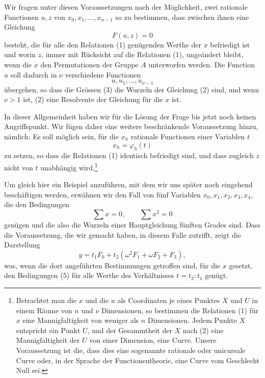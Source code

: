 \documentclass[11pt]{article}
\begin{document}
Wir fragen unter diesen Voraussetzungen nach der Möglichkeit, zwei rationale Functionen \(u,z\) von \(x_0,x_1,\ldots,x_{n-1}\) so zu bestimmen, dass zwischen ihnen eine Gleichung
\begin{equation}
F(u,z)=0
\tag{2}
\end{equation}
besteht, die für alle den Relationen (1) genügenden Werthe der \(x\) befriedigt ist und worin \(z\), immer mit Rücksicht auf die Relationen (1), ungeändert bleibt, wenn die \(x\) den Permutationen der Gruppe \(A\) unterworfen werden. Die Function \(u\) soll dadurch in \(\nu\) verschiedene Functionen
\begin{equation}
u,u_1,\ldots,u_{\nu-1}
\tag{3}
\end{equation}
übergehen, so dass die Grössen (3) die Wurzeln der Gleichung (2) sind, und wenn \(\nu>1\) ist, (2) eine Resolvente der Gleichung für die \(x\) ist.

In dieser Allgemeinheit haben wir für die Lösung der Frage bis jetzt noch keinen Angriffspunkt. Wir fügen daher eine weitere beschränkende Voraussetzung hinzu, nämlich: Es soll möglich sein, für die \(x_h\) rationale Functionen einer Variablen \(t\)
\begin{equation}
x_h=\varphi_h(t)
\tag{4}
\end{equation}
zu setzen, so dass die Relationen (1) identisch befriedigt sind, und dass zugleich \(z\) nicht von \(t\) unabhängig wird.\footnote{Betrachtet man die \(x\) und die \(u\) als Coordinaten je eines Punktes \(X\) und \(U\) in einem Räume von \(n\) und \(\nu\) Dimensionen, so bestimmen die Relationen (1) für \(x\) eine Mannigfaltigkeit von weniger als \(n\) Dimensionen. Jedem Punkte \(X\) entspricht ein Punkt \(U\), und der Gesammtheit der \(X\) nach (2) eine Mannigfaltigkeit der \(U\) von einer Dimension, eine Curve. Unsere Voraussetzung ist die, dass dies eine sogenannte rationale oder unicursale Curve oder, in der Sprache der Functionentheorie, eine Curve vom Geschlecht Null sei.}

Um gleich hier ein Beispiel anzuführen, mit dem wir uns später noch eingehend beschäftigen werden, erwähnen wir den Fall von fünf Variablen \(x_0,x_1,x_2,x_3,x_4\), die den Bedingungen
\begin{equation}
\sum x=0,\qquad
\sum x^2=0
\tag{5}
\end{equation}
genügen und die also die Wurzeln einer Hauptgleichung fünften Grades sind. Dass die Voraussetzung, die wir gemacht haben, in diesem Falle zutrifft, zeigt die Darstellung
\[
y=t_1F_0+t_2(\omega^2F_1+\omega F_2+F_3),
\]
was, wenn die dort angeführten Bestimmungen getroffen sind, für die \(x\) gesetzt, den Bedingungen (5) für alle Werthe des Verhältnisses \(t=t_2:t_1\) genügt.
\end{document}
